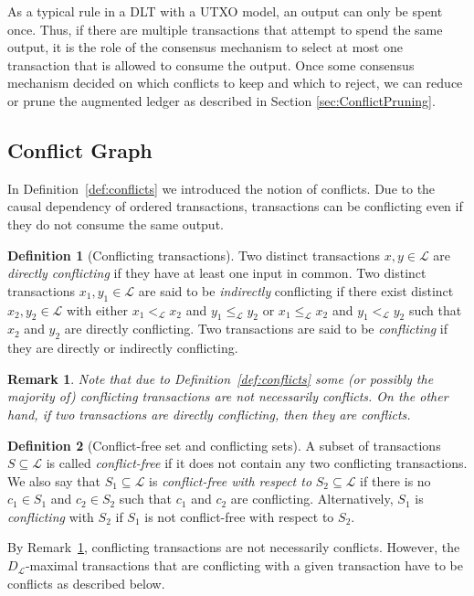 \documentclass[11pt]{article}
\newcommand{\ledger}{\mathcal{L}}
\newcommand{\LedgerDAG}{D_{\ledger}}
\theoremstyle{plain}
\newtheorem{remark}{Remark}
\theoremstyle{definition}
\newtheorem{definition}{Definition}
\numberwithin{definition}{section}
\numberwithin{lemma}{section}
\numberwithin{ass}{section}
\numberwithin{remark}{section}
\numberwithin{example}{section}
\numberwithin{proposition}{section}
\numberwithin{theorem}{section}
\begin{document}
As a typical rule in a DLT with a UTXO model, an output can only be spent once. Thus, if there are multiple transactions that attempt to spend the same output, it is the role of the consensus mechanism to select at most one transaction that is allowed to consume the output. 
Once some consensus mechanism decided on which conflicts to keep and which to reject, we can reduce or prune the augmented ledger as described in Section \ref{sec:ConflictPruning}.




\subsection{Conflict Graph}\label{sec:conflictGraph}

In Definition~\ref{def:conflicts} we introduced the notion of conflicts. Due to the causal dependency of ordered transactions, transactions can be conflicting even if they do not consume the same output.

\begin{definition}[Conflicting transactions]\label{def:conflictingTx}
Two distinct transactions $x,y\in \ledger$ are \emph{directly conflicting} if they have at least one input in common. 
Two distinct transactions $x_1,y_1\in \ledger$ are said to be \emph{indirectly} conflicting  if there exist distinct $x_2,y_2\in \ledger$ with either $x_1 <_{\ledger} x_2$ and $y_1\le_{\ledger} y_2$ or $x_1 \le_{\ledger} x_2$ and $y_1<_{\ledger} y_2$ such that $x_2$ and $y_2$ are directly conflicting. Two transactions are said to be \emph{conflicting} if they are directly or indirectly conflicting.
\end{definition}

\begin{remark}\label{rem: conflicting transaction are not conflicts}
Note that due to Definition~\ref{def:conflicts} some (or possibly the majority of) conflicting transactions are not necessarily conflicts. On the other hand, if two transactions are directly conflicting, then they are conflicts.
\end{remark}


\begin{definition}[Conflict-free set and conflicting sets]\label{def: conflicting sets}
A subset of transactions $S\subseteq \ledger$ is called \textit{conflict-free} if it does not contain any two  conflicting transactions. We also say that $S_1\subseteq \ledger$ is \textit{conflict-free with respect to} $S_2\subseteq \ledger$ if there is no $c_1\in S_1$ and $c_2\in S_2$ such that $c_1$ and $c_2$ are conflicting. Alternatively, $S_1$ is \textit{conflicting} with $S_2$ if $S_1$ is not conflict-free with respect to $S_2$.
\end{definition}
By Remark~\ref{rem: conflicting transaction are not conflicts}, conflicting transactions are not necessarily conflicts. However, the $\LedgerDAG$-maximal transactions that are conflicting with a given transaction have to be conflicts as described below. 
\end{document}
